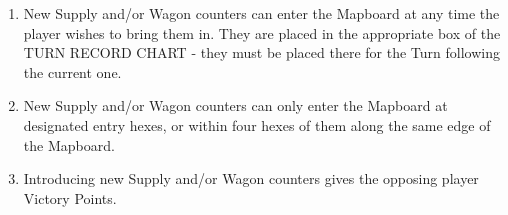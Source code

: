 \begin{enumerate}
  \item New Supply and/or Wagon counters can enter the Mapboard at any time the player wishes to bring them in. They are placed in the appropriate box of the TURN RECORD CHART - they must be placed there for the Turn following the current one.

  \item New Supply and/or Wagon counters can only enter the Mapboard at designated entry hexes, or within four hexes of them along the same edge of the Mapboard.

  \item Introducing new Supply and/or Wagon counters gives the opposing player Victory Points.
\end{enumerate}